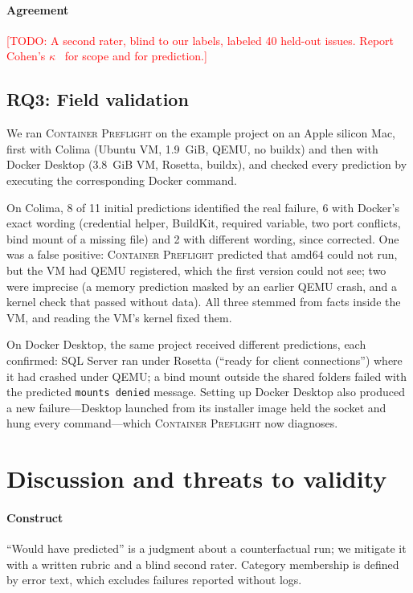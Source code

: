 \documentclass[preprint,12pt]{elsarticle}
\newcommand{\todo}[1]{\textcolor{red}{[TODO: #1]}}
\newcommand{\tool}{\textsc{Container Preflight}}
\begin{document}
\paragraph{Agreement} \todo{A second rater, blind to our labels, labeled 40 held-out issues. Report Cohen's $\kappa$~\cite{cohen1960kappa} for scope and for prediction.}

\subsection{RQ3: Field validation}
\label{sec:field}
We ran \tool{} on the example project on an Apple silicon Mac, first with Colima (Ubuntu VM, 1.9~GiB, QEMU, no buildx) and then with Docker Desktop (3.8~GiB VM, Rosetta, buildx), and checked every prediction by executing the corresponding Docker command.

On Colima, 8 of 11 initial predictions identified the real failure, 6 with Docker's exact wording (credential helper, BuildKit, required variable, two port conflicts, bind mount of a missing file) and 2 with different wording, since corrected. One was a false positive: \tool{} predicted that amd64 could not run, but the VM had QEMU registered, which the first version could not see; two were imprecise (a memory prediction masked by an earlier QEMU crash, and a kernel check that passed without data). All three stemmed from facts inside the VM, and reading the VM's kernel fixed them.

On Docker Desktop, the same project received different predictions, each confirmed: SQL Server ran under Rosetta (``ready for client connections'') where it had crashed under QEMU; a bind mount outside the shared folders failed with the predicted \texttt{mounts denied} message. Setting up Docker Desktop also produced a new failure---Desktop launched from its installer image held the socket and hung every command---which \tool{} now diagnoses.

\section{Discussion and threats to validity}
\label{sec:threats}

\paragraph{Construct} ``Would have predicted'' is a judgment about a counterfactual run; we mitigate it with a written rubric and a blind second rater. Category membership is defined by error text, which excludes failures reported without logs.
\end{document}
